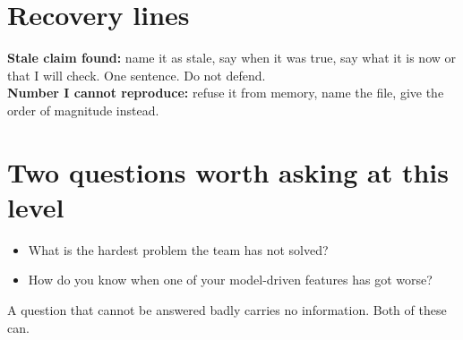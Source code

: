 \section{Recovery lines}
\textbf{Stale claim found:} name it as stale, say when it was true, say what it
is now or that I will check. One sentence. Do not defend.\\
\textbf{Number I cannot reproduce:} refuse it from memory, name the file, give
the order of magnitude instead.

\section{Two questions worth asking at this level}
\begin{itemize}
  \item What is the hardest problem the team has not solved?
  \item How do you know when one of your model-driven features has got worse?
\end{itemize}
{\color{kitgrey}\small A question that cannot be answered badly carries no
information. Both of these can.}


